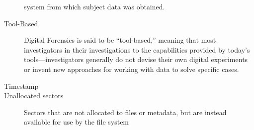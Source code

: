 \begin{description}
  system from which subject data was obtained. 
\item[Tool-Based] Digital Forensics is said to be ``tool-based,''
  meaning that most investigators in their investigations to the
  capabilities provided by today's tools---investigators generally do
  not devise their own digital experiments or invent new approaches
  for working with data to solve specific cases.
\item[Timestamp]
\item[Unallocated sectors] Sectors that are not allocated to files or
  metadata, but are instead available for use by the file system
\end{description}


